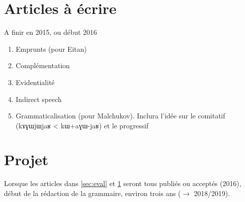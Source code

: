 \documentclass[oldfontcommands,oneside,a4paper,11pt]{article}
\newcommand{\ipa}[1]{{\phon \mbox{#1}}} %
\begin{document}
\section{Articles à écrire} \label{sec:aecrire}
A finir en 2015, ou début 2016

\begin{enumerate}
\item Emprunts (pour Eitan)
\item Complémentation
\item Evidentialité 
\item Indirect speech
\item Grammaticalisation (pour Malchukov). Inclura l'idée sur le comitatif (\ipa{kɤɣɯjɯjaʁ} < \ipa{kɯ}+\ipa{aɣɯ}-\ipa{jaʁ}) et le progressif
\end{enumerate}


\section{Projet} 
 
Lorsque les articles dans \ref{sec:eval} et \ref{sec:aecrire} seront tous publiés ou acceptés (2016), début de la rédaction de la grammaire, environ trois ans ($\rightarrow$ 2018/2019).
   
  



 
\end{document}
